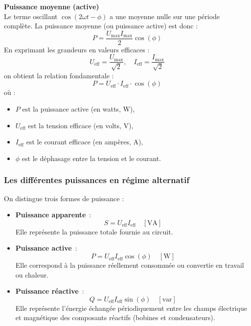 \begin{Note}{\textbf{Puissance moyenne (active)}}\\
Le terme oscillant $\cos(2\omega t - \phi)$ a une moyenne nulle sur une p\'eriode complète.
La puissance moyenne (ou puissance active) est donc :
\[
P = \frac{U_{\text{max}} I_{\text{max}}}{2} \cos(\phi)
\]
En exprimant les grandeurs en valeurs efficaces :
\[
U_{\text{eff}} = \frac{U_{\text{max}}}{\sqrt{2}}, \quad I_{\text{eff}} = \frac{I_{\text{max}}}{\sqrt{2}}
\]
on obtient la relation fondamentale :
\[
\boxed{P = U_{\text{eff}} \cdot I_{\text{eff}} \cdot \cos(\phi)}
\]
où :
\begin{itemize}
    \item $P$ est la puissance active (en watts, W),
    \item $U_{\text{eff}}$ est la tension efficace (en volts, V),
    \item $I_{\text{eff}}$ est le courant efficace (en ampères, A),
    \item $\phi$ est le d\'ephasage entre la tension et le courant.
\end{itemize}
\end{Note}

\subsubsection*{Les diff\'erentes puissances en r\'egime alternatif}
On distingue trois formes de puissance :
\begin{itemize}
    \item \textbf{Puissance apparente}~:
    \[
    S = U_{\text{eff}} I_{\text{eff}} \quad [\text{VA}]
    \]
    Elle repr\'esente la puissance totale fournie au circuit.

    \item \textbf{Puissance active}~:
    \[
    P = U_{\text{eff}} I_{\text{eff}} \cos(\phi) \quad [\text{W}]
    \]
    Elle correspond à la puissance r\'eellement consomm\'ee ou convertie en travail ou chaleur.

    \item \textbf{Puissance r\'eactive}~:
    \[
    Q = U_{\text{eff}} I_{\text{eff}} \sin(\phi) \quad [\text{var}]
    \]
    Elle repr\'esente l’\'energie \'echang\'ee p\'eriodiquement entre les champs \'electrique et magn\'etique des composants r\'eactifs (bobines et condensateurs).
\end{itemize}

